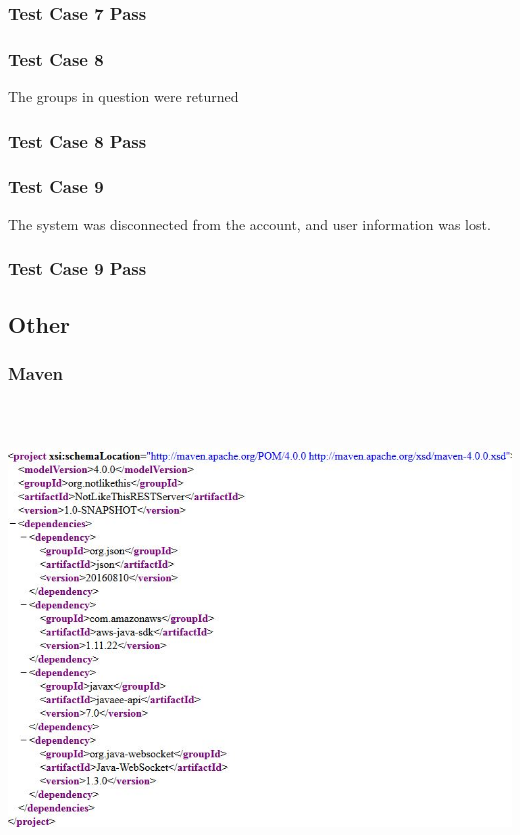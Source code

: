 \documentclass[hidelinks,a4paper,12pt]{article}
\begin{document}
\subsubsection{Test Case 7 Pass}
\subsubsection{Test Case 8}
The groups in question were returned
\subsubsection{Test Case 8 Pass}
\subsubsection{Test Case 9}
The system was disconnected from the account, and user information was lost.
\subsubsection{Test Case 9 Pass}

\subsection{Other}
\subsubsection{Maven}
\includegraphics[width=17.3cm,height=12.5cm]{./images/maven.jpg}
\end{document}
